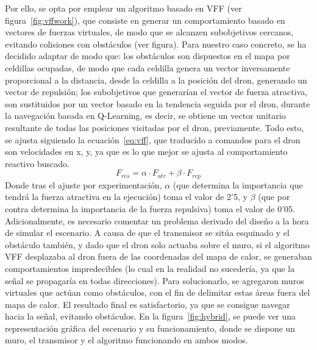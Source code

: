 Por ello, se opta por emplear un algoritmo basado en \ac{VFF} (ver figura~\ref{fig:vffwork}), que consiste en generar un comportamiento basado en vectores de fuerzas virtuales, de modo que se alcanzen subobjetivos cercanos, evitando colisiones con obstáculos (ver figura). Para nuestro caso concreto, se ha decidido adaptar de modo que: los obstáculos son dispuestos en el mapa por celdillas ocupadas, de modo que cada celdilla genera un vector inversamente proporcional a la distancia, desde la celdilla a la posición del dron, generando un vector de repulsión; los subobjetivos que generarían el vector de fuerza atractiva, son sustituidos por un vector basado en la tendencia seguida por el dron, durante la navegación basada en Q-Learning, es decir, se obtiene un vector unitario resultante de todas las posiciones visitadas por el dron, previamente. Todo esto, se ajusta siguiendo la ecuación~\ref{eq:vff}, que traducido a comandos para el dron son velocidades en x, y, ya que es lo que mejor se ajusta al comportamiento reactivo buscado.
\begin{equation}
    F_{res} = \alpha \cdot F_{atr} + \beta \cdot F_{rep}
    \label{eq:vff}
\end{equation}
Donde tras el ajuste por experimentación, $\alpha$ (que determina la importancia que tendrá la fuerza atractiva en la ejecución) toma el valor de 2'5, y $\beta$ (que por contra determina la importancia de la fuerza repulsiva) toma el valor de 0'05. Adicionalmente, es necesario comentar un problema derivado del diseño a la hora de simular el escenario. A causa de que el transmisor se sitúa esquinado y el obstáculo también, y dado que el dron solo actuaba sobre el muro, si el algoritmo \ac{VFF} desplazaba al dron fuera de las coordenadas del mapa de calor, se generaban comportamientos impredecibles (lo cual en la realidad no sucedería, ya que la señal se propagaría en todas direcciones). Para solucionarlo, se agregaron muros virtuales que actúan como obstáculos, con el fin de delimitar estas áreas fuera del mapa de calor. El resultado final es satisfactorio, ya que se consigue navegar hacia la señal, evitando obstáculos. En la figura~\ref{fig:hybrid}, se puede ver una representación gráfica del escenario y su funcionamiento, donde se dispone un muro, el transmisor y el algoritmo funcionando en ambos modos.

